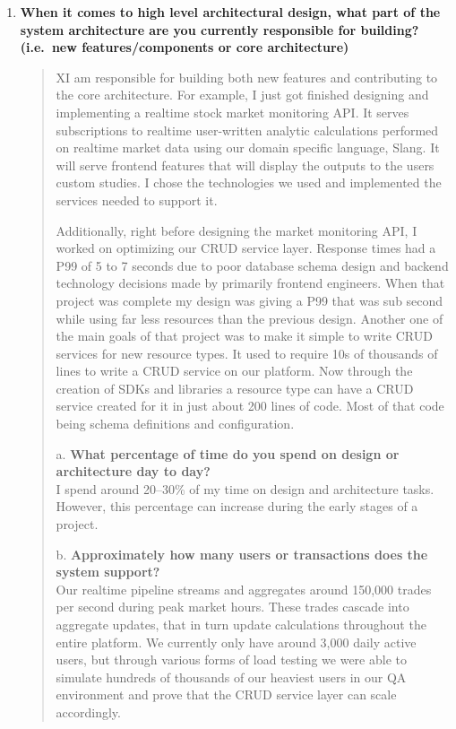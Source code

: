 \begin{cvparagraph}
\begin{enumerate}
\begin{quote}
      \end{quote}
      \item \textbf{When it comes to high level architectural design, what part of the system architecture are you currently responsible for building?
      (i.e.\ new features/components or core architecture)} \\
      \begin{quote}
          XI am responsible for building both new features and contributing to the core architecture.
          For example, I just got finished designing and implementing a realtime stock market monitoring API.
          It serves subscriptions to realtime user-written analytic calculations performed on realtime market data using our domain specific language, Slang.
          It will serve frontend features that will display the outputs to the users custom studies.
          I chose the technologies we used and implemented the services needed to support it.

          Additionally, right before designing the market monitoring API, I worked on optimizing our CRUD service layer.
          Response times had a P99 of 5 to 7 seconds due to poor database schema design and backend technology decisions made by primarily frontend engineers.
          When that project was complete my design was giving a P99 that was sub second while using far less resources than the previous design.
          Another one of the main goals of that project was to make it simple to write CRUD services for new resource types.
          It used to require 10s of thousands of lines to write a CRUD service on our platform.
          Now through the creation of SDKs and libraries a resource type can have a CRUD service created for it in just about 200 lines of code.
          Most of that code being schema definitions and configuration.

          a. \textbf{What percentage of time do you spend on design or architecture day to day?} \\
          I spend around 20--30\% of my time on design and architecture tasks.
          However, this percentage can increase during the early stages of a project.

          b. \textbf{Approximately how many users or transactions does the system support?} \\
          Our realtime pipeline streams and aggregates around 150,000 trades per second during peak market hours.
          These trades cascade into aggregate updates, that in turn update calculations throughout the entire platform.
          We currently only have around 3,000 daily active users, but through various forms of load testing we were able to simulate hundreds of thousands of our heaviest users in our QA environment and prove that the CRUD service layer can scale accordingly.


\end{quote}
\end{enumerate}
\end{cvparagraph}
